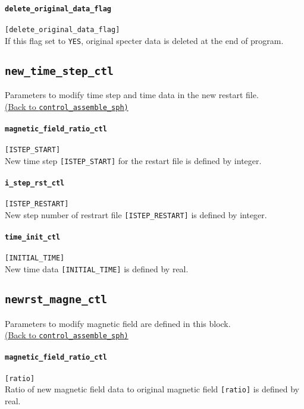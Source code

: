 \paragraph{\tt delete\_original\_data\_flag}
\label{href_t:delete_original_data_flag}
\verb|[delete_original_data_flag]| \\
If this flag set to \verb|YES|, original specter data is deleted at the end of program. 

\subsection{\tt new\_time\_step\_ctl}
\label{href_t:new_time_step_ctl}
Parameters to modify time step and time data in the new restart file. \\
\hyperref[href_i:new_time_step_ctl]{(Back to {\tt control\_assemble\_sph)}}

\paragraph{\tt magnetic\_field\_ratio\_ctl}
\label{href_t:i_step_init_ctl_a} 
\verb|[ISTEP_START]| \\
New time step \verb|[ISTEP_START]| for the restart file is defined by integer.

\paragraph{\tt i\_step\_rst\_ctl}
\label{href_t:i_step_rst_ctl_a} 
\verb|[ISTEP_RESTART]| \\
New step number of restrart file \verb|[ISTEP_RESTART]| is defined by integer.

\paragraph{\tt time\_init\_ctl}
\label{href_t:time_init_ctl_a} 
\verb|[INITIAL_TIME]| \\
New time data \verb|[INITIAL_TIME]| is defined by real.


\subsection{\tt newrst\_magne\_ctl}
\label{href_t:newrst_magne_ctl}
Parameters to modify magnetic field are defined in this block. \\
\hyperref[href_i:newrst_magne_ctl]{(Back to {\tt control\_assemble\_sph)}}

\paragraph{\tt magnetic\_field\_ratio\_ctl}
\label{href_t:magnetic_field_ratio_ctl} 
\verb|[ratio]| \\
Ratio of new magnetic field data to original magnetic field \verb|[ratio]| is defined by real.


